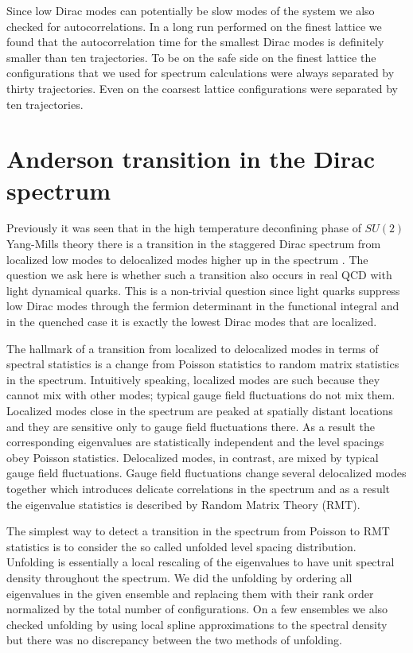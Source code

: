 \documentclass[twocolumn, prd, preprintnumbers, amsmath,
  amssymb, showpacs, floatfix]{revtex4-1}
\begin{document}
Since low Dirac modes can potentially be slow modes of the system we also
checked for autocorrelations. In a long run performed on the finest lattice we
found that the autocorrelation time for the smallest Dirac modes is definitely
smaller than ten trajectories. To be on the safe side on the finest lattice
the configurations that we used for spectrum calculations were always
separated by thirty trajectories. Even on the coarsest lattice configurations
were separated by ten trajectories.



\section{Anderson transition in the Dirac spectrum}
     \label{se:AtitDs}


Previously it was seen that in the high temperature deconfining phase of
$SU(2)$ Yang-Mills theory there is a transition in the staggered Dirac
spectrum from localized low modes to delocalized modes higher up in the
spectrum \cite{Kovacs:2010wx}. The question we ask here is whether such a
transition also occurs in real QCD with light dynamical quarks. This is a
non-trivial question since light quarks suppress low Dirac modes through the
fermion determinant in the functional integral and in the quenched case it is
exactly the lowest Dirac modes that are localized.

The hallmark of a transition from localized to delocalized modes in terms of
spectral statistics is a change from Poisson statistics to random matrix
statistics in the spectrum. Intuitively speaking, localized modes are such
because they cannot mix with other modes; typical gauge field fluctuations do
not mix them. Localized modes close in the spectrum are peaked at spatially
distant locations and they are sensitive only to gauge field fluctuations
there. As a result the corresponding eigenvalues are statistically independent
and the level spacings obey Poisson statistics. Delocalized modes, in
contrast, are mixed by typical gauge field fluctuations. Gauge field
fluctuations change several delocalized modes together which introduces
delicate correlations in the spectrum and as a result the eigenvalue
statistics is described by Random Matrix Theory (RMT).

The simplest way to detect a transition in the spectrum from Poisson to RMT
statistics is to consider the so called unfolded level spacing
distribution. Unfolding is essentially a local rescaling of the eigenvalues to
have unit spectral density throughout the spectrum. We did the unfolding by
ordering all eigenvalues in the given ensemble and replacing them with their
rank order normalized by the total number of configurations. On a few
ensembles we also checked unfolding by using local spline approximations to
the spectral density but there was no discrepancy between the two methods of
unfolding.
\end{document}
